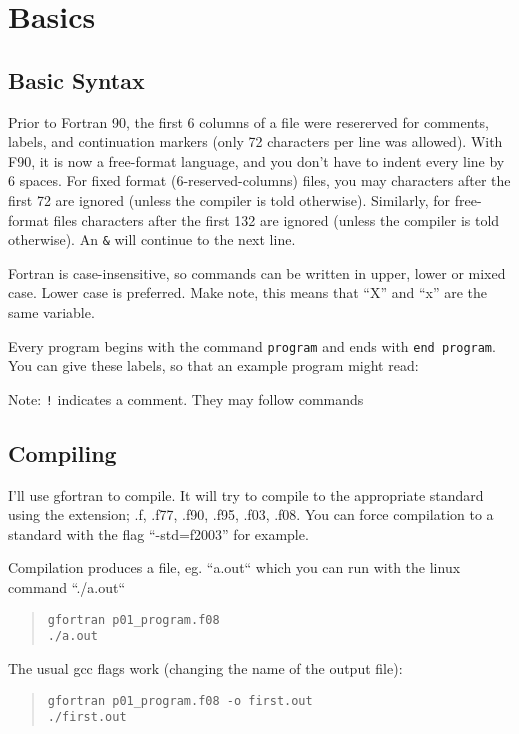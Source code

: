 
\section{Basics}


\subsection{Basic Syntax}
Prior to Fortran 90, the first 6 columns of a file were resererved for comments, labels, and continuation markers (only 72 characters per line was allowed).
 With F90, it is now a free-format language, and you don't have to indent every line by 6 spaces.
 For fixed format (6-reserved-columns) files, you may characters after the first 72 are ignored (unless the compiler is told otherwise).
 Similarly, for free-format files characters after the first 132 are ignored (unless the compiler is told otherwise).
 An \texttt{{\&}} will continue to the next line.

Fortran is case-insensitive, so commands can be written in upper, lower or mixed case. Lower case is preferred. Make note, this means that ``X'' and ``x'' are the same variable.

Every program begins with the command \texttt{program} and ends with \texttt{end program}. You can give these labels, so that an example program might read:
\begin{quote}

\end{quote}
\noindent Note: \texttt{!} indicates a comment. They may follow commands


\subsection{Compiling}
I'll use gfortran to compile. It will try to compile to the appropriate standard using the extension; .f, .f77, .f90, .f95, .f03, .f08. You can force compilation to a standard with the flag ``-std=f2003'' for example.

Compilation produces a file, eg. ``a.out`` which you can run with the linux command ``./a.out``
\begin{quote}
\begin{verbatim}
gfortran p01_program.f08
./a.out
\end{verbatim}
\end{quote}

\noindent The usual gcc flags work (changing the name of the output file):
\begin{quote}
\begin{verbatim}
gfortran p01_program.f08 -o first.out
./first.out
\end{verbatim}
\end{quote}


